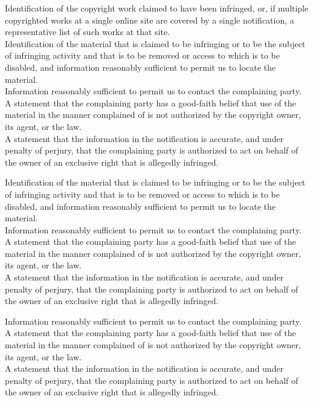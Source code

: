 Identification of the copyright work claimed to have been infringed, or,
if multiple copyrighted works at a single online site are covered by a
single notification, a representative list of such works at that site.\\
Identification of the material that is claimed to be infringing or to be
the subject of infringing activity and that is to be removed or access
to which is to be disabled, and information reasonably sufficient to
permit us to locate the material.\\
Information reasonably sufficient to permit us to contact the
complaining party.\\
A statement that the complaining party has a good-faith belief that use
of the material in the manner complained of is not authorized by the
copyright owner, its agent, or the law.\\
A statement that the information in the notification is accurate, and
under penalty of perjury, that the complaining party is authorized to
act on behalf of the owner of an exclusive right that is allegedly
infringed.

Identification of the material that is claimed to be infringing or to be
the subject of infringing activity and that is to be removed or access
to which is to be disabled, and information reasonably sufficient to
permit us to locate the material.\\
Information reasonably sufficient to permit us to contact the
complaining party.\\
A statement that the complaining party has a good-faith belief that use
of the material in the manner complained of is not authorized by the
copyright owner, its agent, or the law.\\
A statement that the information in the notification is accurate, and
under penalty of perjury, that the complaining party is authorized to
act on behalf of the owner of an exclusive right that is allegedly
infringed.

Information reasonably sufficient to permit us to contact the
complaining party.\\
A statement that the complaining party has a good-faith belief that use
of the material in the manner complained of is not authorized by the
copyright owner, its agent, or the law.\\
A statement that the information in the notification is accurate, and
under penalty of perjury, that the complaining party is authorized to
act on behalf of the owner of an exclusive right that is allegedly
infringed.


